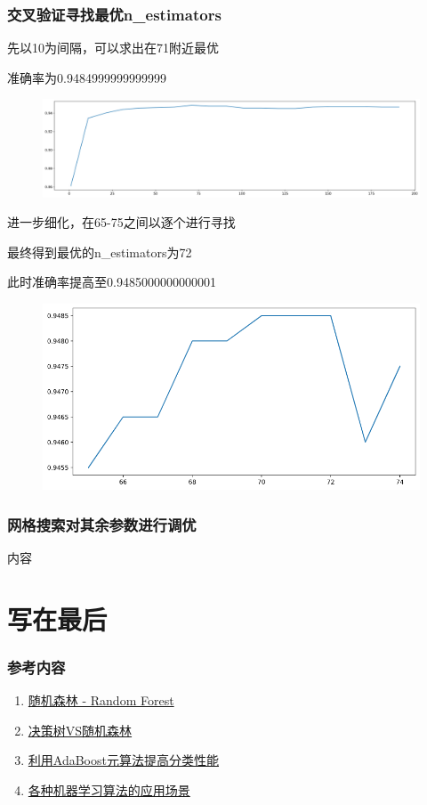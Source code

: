 \documentclass[aspectratio=43, 12pt, utf8, mathserif]{ctexbeamer} %
\begin{document}
\begin{frame}
    \frametitle{交叉验证寻找最优n\_estimators}
    先以10为间隔，可以求出在71附近最优
    
    准确率为0.9484999999999999
    \begin{figure}[h]
        \centering
        \includegraphics[width=\textwidth]{image/n_estimators.png}
    \end{figure}
\end{frame}

\begin{frame}
    进一步细化，在65-75之间以逐个进行寻找
    
    最终得到最优的n\_estimators为72
    
    此时准确率提高至0.9485000000000001
    \begin{figure}[h]
        \centering
        \includegraphics[height=0.5\textheight]{image/n_estimators_final.png}
    \end{figure}
\end{frame}

\begin{frame}
    \frametitle{网格搜索对其余参数进行调优}
    内容
\end{frame}

\section{写在最后}
\begin{frame}
    \frametitle{参考内容}
    \begin{enumerate}
        \item \href{https://zhuanlan.zhihu.com/p/44695084}{随机森林 - Random Forest}
        \item \href{https://www.jiqizhixin.com/articles/2020-06-11-6}{决策树VS随机森林}
        \item \href{https://blog.csdn.net/baidu_31657889/article/details/93891552?utm_source=app&app_version=4.7.1}{利用AdaBoost元算法提高分类性能}
        \item \href{https://www.zhihu.com/question/26726794/answer/151282052}{各种机器学习算法的应用场景}
    \end{enumerate}
\end{frame}

\begin{frame}
\end{frame}
\end{document}
